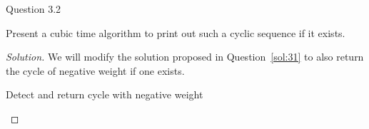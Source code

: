 \begin{solution}{Question 3.2}
    \begin{question}
        Present a cubic time algorithm to print out such a cyclic sequence if it exists.
    \end{question}
    \tcblower{}
    \begin{proof}[Solution]
        We will modify the solution proposed in Question~\ref{sol:31} to also return the cycle of negative weight if one exists. 
        \begin{algorithm}[H]
            \caption{Detect and return cycle with negative weight}\label{alg:findcycle}
            \begin{algorithmic}[1]
                        
                       
                            \EndIf{}
                        \EndFor{}
                    \EndFor{}
                        \EndIf{}
                    \EndFor{}
                    \EndIf{}
                    \EndFor{}
            \end{algorithmic}
        \end{algorithm}
        \begin{algorithm}[H]
            \begin{algorithmic}[1]

\end{algorithmic}
\end{algorithm}
\end{proof}
\end{solution}
